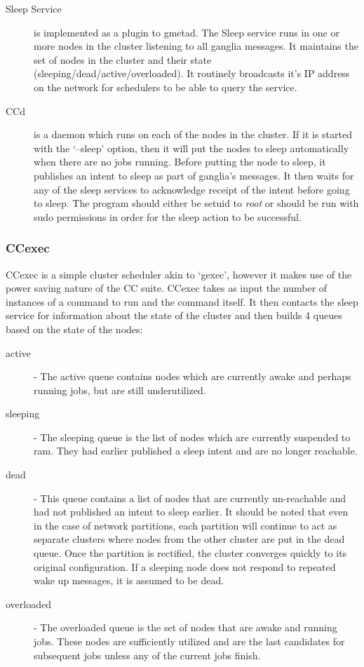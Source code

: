 \begin{description}
    \item[Sleep Service] is implemented as a plugin to gmetad. The Sleep service runs in one or more nodes in the cluster listening to all ganglia messages. It maintains the set of nodes in the cluster and their state (sleeping/dead/active/overloaded). It routinely broadcasts it's IP address on the network for schedulers to be able to query the service. 
    \item[CCd] is a daemon which runs on each of the nodes in the cluster. If it is started with the `--sleep' option, then it will put the nodes to sleep automatically when there are no jobs running. Before putting the node to sleep, it publishes an intent to sleep as part of ganglia's messages. It then waits for any of the sleep services to acknowledge receipt of the intent before going to sleep. The program should either be setuid to {\em root} or should be run with sudo permissions in order for the sleep action to be successful.
\end{description}

\subsubsection{CCexec} %
\label{ssub:ccexec}
CCexec is a simple cluster scheduler akin to `gexec', however it makes use of the power saving nature of the CC suite. CCexec takes as input the number of instances of a command to run and the command itself. It then contacts the sleep service for information about the state of the cluster and then builds 4 queues based on the state of the nodes:
\begin{description}
    \item[active] - The active queue contains nodes which are currently awake and perhaps running jobs, but are still underutilized. 
    \item[sleeping] - The sleeping queue is the list of nodes which are currently suspended to ram. They had earlier published a sleep intent and are no longer reachable.
    \item[dead] - This queue contains a list of nodes that are currently un-reachable and had not published an intent to sleep earlier. It should be noted that even in the case of network partitions, each partition will continue to act as separate clusters where nodes from the other cluster are put in the dead queue. Once the partition is rectified, the cluster converges quickly to its original configuration. If a sleeping node does not respond to repeated wake up messages, it is assumed to be dead. 
    \item[overloaded] - The overloaded queue is the set of nodes that are awake and running jobs. These nodes are sufficiently utilized and are the last candidates for subsequent jobs unless any of the current jobs finish.
\end{description}

